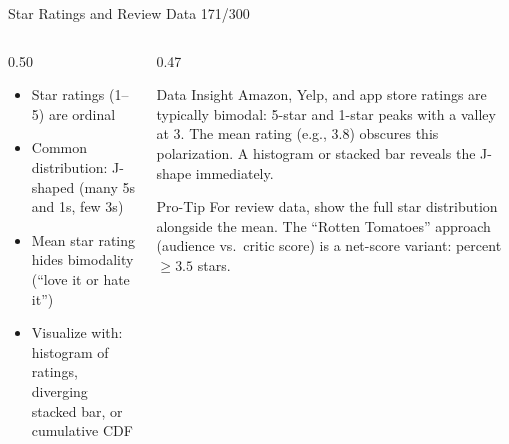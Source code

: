 \documentclass[10pt]{beamer}
\newcommand{\smark}[1]{\hfill{\scriptsize\color{codegray}#1}}
\begin{document}
\begin{frame}{Star Ratings and Review Data}
\smark{171/300}
\begin{columns}[T]
\begin{column}{0.50\textwidth}
\begin{itemize}
    \item Star ratings (1--5) are ordinal
    \item Common distribution: J-shaped (many 5s and 1s, few 3s)
    \item Mean star rating hides bimodality (``love it or hate it'')
    \item Visualize with: histogram of ratings, diverging stacked bar, or cumulative CDF
\end{itemize}
\end{column}
\begin{column}{0.47\textwidth}
\begin{exampleblock}{Data Insight}
    \scriptsize Amazon, Yelp, and app store ratings are typically bimodal: 5-star and 1-star peaks with a valley at 3. The mean rating (e.g., 3.8) obscures this polarization. A histogram or stacked bar reveals the J-shape immediately.
\end{exampleblock}
\vspace{0.1cm}
\begin{alertblock}{Pro-Tip}
    \scriptsize For review data, show the full star distribution alongside the mean. The ``Rotten Tomatoes'' approach (audience vs.\ critic score) is a net-score variant: percent $\geq 3.5$ stars.
\end{alertblock}
\end{column}
\end{columns}
\end{frame}
\end{document}
